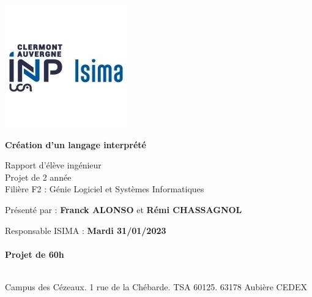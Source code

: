 \begin{titlepage}
    \includegraphics{img/logo_isima_inp.jpeg}
       \begin{center}
           \vspace*{1cm}
               
           \Huge
           \textbf{Création d'un langage interprété}
               
           \vspace{0.5cm}
           \LARGE
           Rapport d'élève ingénieur\\
           Projet de 2 année\\
           Filière F2 : Génie Logiciel et Systèmes Informatiques
               
           \vspace{1.5cm}
               
           Présenté par : \textbf{Franck ALONSO} et \textbf{Rémi CHASSAGNOL}
               
           \vfill
               
           \vspace{0.5cm}
         \end{center}          
   
               
           \large
           \noindent
           Responsable ISIMA : \hfill \textbf{Mardi 31/01/2023}\\~\\
           \raggedleft \textbf{Projet de 60h}\\~\\
           \raggedright
           Campus des Cézeaux. 1 rue de la Chébarde. TSA 60125. 63178 Aubière CEDEX\\
     
               
   
   \end{titlepage}